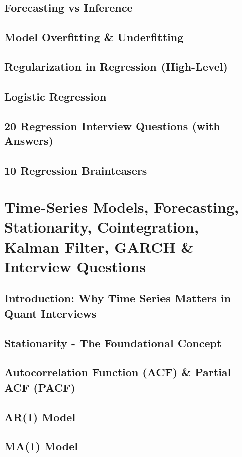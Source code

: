 \documentclass{report}
\begin{document}
\subsection*{Forecasting vs Inference}
\subsection*{Model Overfitting \& Underfitting}
\subsection*{Regularization in Regression (High-Level)}
\subsection*{Logistic Regression}
\subsection*{20 Regression Interview Questions (with Answers)}
\subsection*{10 Regression Brainteasers}

\section{Time-Series Models, Forecasting, Stationarity, Cointegration, Kalman Filter, GARCH \& Interview Questions}
\subsection*{Introduction: Why Time Series Matters in Quant Interviews}
\subsection*{Stationarity - The Foundational Concept}
\subsection*{Autocorrelation Function (ACF) \& Partial ACF (PACF)}
\subsection*{AR(1) Model}
\subsection*{MA(1) Model}
\end{document}
